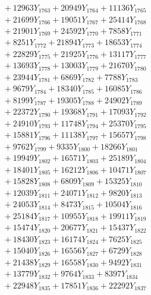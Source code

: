 \documentclass[a4paper,10pt]{article}
\begin{document}
{\begin{align}
&\;  + 12963 Y_{1763} + 20949 Y_{1764} + 11136 Y_{1765} \\[0.3ex]
&\;  + 21699 Y_{1766} + 19051 Y_{1767} + 25414 Y_{1768} \\[0.5ex]\allowbreak
&\;  + 21901 Y_{1769} + 24592 Y_{1770} + 7858 Y_{1771} \\[0.3ex]
&\;  + 8251 Y_{1772} + 21894 Y_{1773} + 18653 Y_{1774} \\[0.3ex]
&\;  + 22829 Y_{1775} + 21925 Y_{1776} + 13117 Y_{1777} \\[0.3ex]
&\;  + 13693 Y_{1778} + 13003 Y_{1779} + 21670 Y_{1780} \\[0.3ex]
&\;  + 23944 Y_{1781} + 6869 Y_{1782} + 7788 Y_{1783} \\[0.3ex]
&\;  + 9679 Y_{1784} + 18340 Y_{1785} + 16085 Y_{1786} \\[0.3ex]
&\;  + 8199 Y_{1787} + 19305 Y_{1788} + 24902 Y_{1789} \\[0.3ex]
&\;  + 22372 Y_{1790} + 19368 Y_{1791} + 17093 Y_{1792} \\[0.3ex]
&\;  + 24910 Y_{1793} + 11748 Y_{1794} + 25370 Y_{1795} \\[0.3ex]
&\;  + 15881 Y_{1796} + 11138 Y_{1797} + 15657 Y_{1798} \\[0.5ex]\allowbreak
&\;  + 9762 Y_{1799} + 9335 Y_{1800} + 18266 Y_{1801} \\[0.3ex]
&\;  + 19949 Y_{1802} + 16571 Y_{1803} + 25189 Y_{1804} \\[0.3ex]
&\;  + 18401 Y_{1805} + 16212 Y_{1806} + 10471 Y_{1807} \\[0.3ex]
&\;  + 15828 Y_{1808} + 6809 Y_{1809} + 15325 Y_{1810} \\[0.3ex]
&\;  + 12039 Y_{1811} + 24071 Y_{1812} + 9820 Y_{1813} \\[0.3ex]
&\;  + 24053 Y_{1814} + 8473 Y_{1815} + 10504 Y_{1816} \\[0.3ex]
&\;  + 25184 Y_{1817} + 10955 Y_{1818} + 19911 Y_{1819} \\[0.3ex]
&\;  + 15474 Y_{1820} + 20677 Y_{1821} + 15437 Y_{1822} \\[0.3ex]
&\;  + 18430 Y_{1823} + 16174 Y_{1824} + 7625 Y_{1825} \\[0.3ex]
&\;  + 15040 Y_{1826} + 16556 Y_{1827} + 6729 Y_{1828} \\[0.5ex]\allowbreak
&\;  + 21438 Y_{1829} + 16558 Y_{1830} + 9492 Y_{1831} \\[0.3ex]
&\;  + 13779 Y_{1832} + 9764 Y_{1833} + 8397 Y_{1834} \\[0.3ex]
&\;  + 22948 Y_{1835} + 17851 Y_{1836} + 22292 Y_{1837} \\[0.3ex]

\end{align}}
\end{document}
